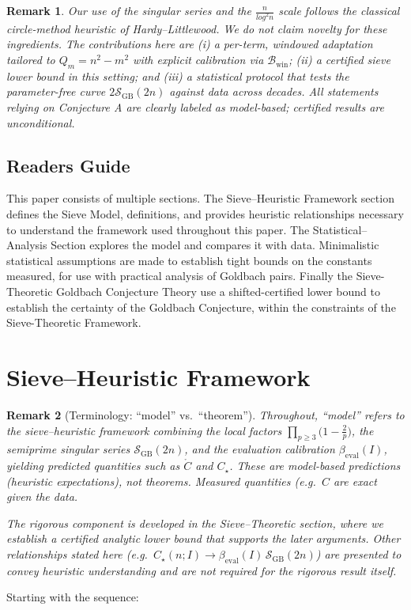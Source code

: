 \documentclass[11pt]{article}
\theoremstyle{inline}
\newtheorem*{remark}{Remark}
\theoremstyle{break}
\theoremstyle{break}
\theoremstyle{break}
\theoremstyle{break}
\theoremstyle{break}
\theoremstyle{inline}
\newcommand{\twin}{{\scriptscriptstyle\mathrm{win}}}
\newcommand{\Cmeas}{C}              %
\newcommand{\Cpred}{\mathring{C}}   %
\newcommand{\SGB}{\mathcal{S}_{\scriptscriptstyle\mathrm{GB}}}
\newcommand{\Bwin}{\mathcal{B}_\twin}
\newcommand{\betacal}{\beta_{\mathrm{eval}}}
\begin{document}
\begin{remark}
Our use of the singular series and the \(  \frac{n}{log^2 n} \) scale follows the classical circle-method heuristic of Hardy–Littlewood.\cite{HardyLittlewood1923} We do not claim novelty for these ingredients. The contributions here are (i) a per-term, windowed adaptation tailored to \( Q_m = n^2 - m^2 \)  with explicit calibration via \( \Bwin \); (ii) a certified sieve lower bound in this setting; and (iii) a statistical protocol that tests the parameter-free curve \( 2\SGB(2n) \) against data across decades. All statements relying on Conjecture A are clearly labeled as model-based; certified results are unconditional.
\end{remark}


\subsection*{Readers Guide}
This paper consists of multiple sections.  The Sieve--Heuristic Framework section defines the Sieve Model, definitions, and provides heuristic relationships necessary to understand the framework used throughout this paper.   The Statistical--Analysis Section explores the model and compares it with data.  Minimalistic statistical assumptions are made to establish tight bounds on the constants measured, for use with practical analysis of Goldbach pairs.   Finally the Sieve-Theoretic Goldbach Conjecture Theory use a shifted-certified lower bound to establish the certainty of the Goldbach Conjecture, within the constraints of the Sieve-Theoretic Framework.


\section*{Sieve--Heuristic Framework}

\begin{remark}[Terminology: ``model'' vs.\ ``theorem'']
Throughout, ``model'' refers to the sieve–heuristic framework combining the local
factors \( \prod_{p\ge3}\!\bigl(1-\tfrac{2}{p}\bigr) \), the semiprime singular series
\( \SGB(2n) \), and the evaluation calibration \( \betacal(I) \), yielding
predicted quantities such as \( \Cpred \) and \( C_\star \). These are
\emph{model-based predictions} (heuristic expectations), not theorems.
Measured quantities (e.g.\ \( \Cmeas \) are exact given the data.

The rigorous component is developed in the Sieve–Theoretic section, where we 
establish a certified analytic lower bound that supports the later arguments.
Other relationships stated here (e.g.\ \( C_\star(n;I)\to \betacal(I)\,\SGB(2n) \))
are presented to convey heuristic understanding and are not required
for the rigorous result itself.
\end{remark}
Starting with the sequence:
\end{document}
